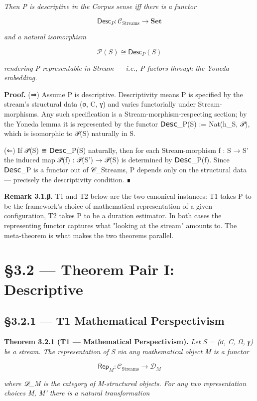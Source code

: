 \documentclass[11pt, openany]{book}
\newcommand{\sectionbreak}{\clearpage}
\begin{document}
\textit{Then P is descriptive in the Corpus sense iff there is a functor}

\[
\mathsf{Desc}_P : \mathcal{C}_\mathrm{Streams} \to \mathbf{Set}
\]

\textit{and a natural isomorphism}

\[
\mathcal{P}(S) \cong \mathsf{Desc}_P(S)
\]

\textit{rendering P representable in Stream --- i.e., P factors through the Yoneda embedding.}

\textbf{Proof.} (⇒) Assume P is descriptive. Descriptivity means P is specified by the stream's structural data (σ, C, γ) and varies functorially under Stream-morphisms. Any such specification is a Stream-morphism-respecting section; by the Yoneda lemma it is represented by the functor 𝖣𝖾𝗌𝖼\_\allowbreak{}P(S) := Nat(h\_\allowbreak{}S, 𝒫), which is isomorphic to 𝒫(S) naturally in S.

(⇐) If 𝒫(S) ≅ 𝖣𝖾𝗌𝖼\_\allowbreak{}P(S) naturally, then for each Stream-morphism f : S → S' the induced map 𝒫(f) : 𝒫(S') → 𝒫(S) is determined by 𝖣𝖾𝗌𝖼\_\allowbreak{}P(f). Since 𝖣𝖾𝗌𝖼\_\allowbreak{}P is a functor out of 𝒞\_\allowbreak{}Streams, P depends only on the structural data --- precisely the descriptivity condition. ∎

\textbf{Remark 3.1.β.} T1 and T2 below are the two canonical instances: T1 takes P to be the framework's choice of mathematical representation of a given configuration, T2 takes P to be a duration estimator. In both cases the representing functor captures what "looking at the stream" amounts to. The meta-theorem is what makes the two theorems parallel.

\sectionbreak

\section{§3.2 --- Theorem Pair I: Descriptive}

\subsection{§3.2.1 --- T1 Mathematical Perspectivism}

\textbf{Theorem 3.2.1 (T1 --- Mathematical Perspectivism).} \textit{Let S = (σ, C, Ω, γ) be a stream. The representation of S via any mathematical object M is a functor}

\[
\mathsf{Rep}_M : \mathcal{C}_\mathrm{Streams} \to \mathcal{D}_M
\]

\textit{where 𝒟\_\allowbreak{}M is the category of M-structured objects. For any two representation choices M, M' there is a natural transformation}
\end{document}
